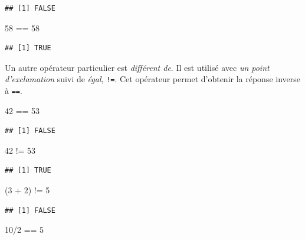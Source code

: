 \documentclass[twoside,symmetric]{book}
\newenvironment{Shaded}{}{}
\newcommand{\DecValTok}[1]{#1}
\newcommand{\NormalTok}[1]{#1}
\newcommand{\OperatorTok}[1]{#1}
\newcommand{\StringTok}[1]{#1}
\begin{document}
\begin{verbatim}
## [1] FALSE
\end{verbatim}

\begin{Shaded}
\begin{Highlighting}[]
\DecValTok{58} \OperatorTok{==}\StringTok{ }\DecValTok{58}
\end{Highlighting}
\end{Shaded}

\begin{verbatim}
## [1] TRUE
\end{verbatim}

Un autre opérateur particulier est \emph{différent de}. Il est utilisé avec \emph{un point d'exclamation} suivi de \emph{égal}, \texttt{!=}. Cet opérateur permet d'obtenir la réponse inverse à \texttt{==}.

\begin{Shaded}
\begin{Highlighting}[]
\DecValTok{42} \OperatorTok{==}\StringTok{ }\DecValTok{53}
\end{Highlighting}
\end{Shaded}

\begin{verbatim}
## [1] FALSE
\end{verbatim}

\begin{Shaded}
\begin{Highlighting}[]
\DecValTok{42} \OperatorTok{!=}\StringTok{ }\DecValTok{53}
\end{Highlighting}
\end{Shaded}

\begin{verbatim}
## [1] TRUE
\end{verbatim}

\begin{Shaded}
\begin{Highlighting}[]
\NormalTok{(}\DecValTok{3} \OperatorTok{+}\StringTok{ }\DecValTok{2}\NormalTok{) }\OperatorTok{!=}\StringTok{ }\DecValTok{5}
\end{Highlighting}
\end{Shaded}

\begin{verbatim}
## [1] FALSE
\end{verbatim}

\begin{Shaded}
\begin{Highlighting}[]
\DecValTok{10}\OperatorTok{/}\DecValTok{2} \OperatorTok{==}\StringTok{ }\DecValTok{5}
\end{Highlighting}
\end{Shaded}
\end{document}
